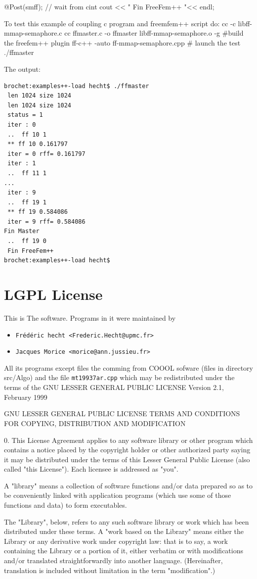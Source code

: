\documentclass[a4paper,twoside,12pt]{book}
\begin{document}
@Post(smff); // wait from cint
cout << " Fin FreeFem++ "<< endl;

\eFF	
To test this example of coupling c program and freemfem++ script do:
\bFF 
 cc -c libff-mmap-semaphore.c
 cc ffmaster.c -o ffmaster  libff-mmap-semaphore.o -g
 #build the freefem++ plugin
  ff-c++ -auto ff-mmap-semaphore.cpp
 # launch the test
 ./ffmaster
\eFF
 
 The output:
{\scriptsize
\begin{verbatim}
brochet:examples++-load hecht$ ./ffmaster 
 len 1024 size 1024 
 len 1024 size 1024 
 status = 1
 iter : 0 
 ..  ff 10 1
 ** ff 10 0.161797
 iter = 0 rff= 0.161797
 iter : 1 
 ..  ff 11 1
...
 iter : 9 
 ..  ff 19 1
 ** ff 19 0.584086
 iter = 9 rff= 0.584086
Fin Master 
 ..  ff 19 0
 Fin FreeFem++ 
brochet:examples++-load hecht$ 
\end{verbatim}
}
\section*{\freefempp LGPL License}
This is The \freefempp software.
Programs in it were maintained by
\begin{itemize}
\item \texttt{Fr\'{e}d\'{e}ric hecht <Frederic.Hecht@upmc.fr>}
\item \texttt{Jacques Morice <morice@ann.jussieu.fr>}
\end{itemize}

All its programs except files the comming from
  COOOL sofware (files in directory src/Algo)
 and the file \texttt{mt19937ar.cpp}
which may be redistributed under the terms of the
 GNU LESSER GENERAL PUBLIC LICENSE Version 2.1, February 1999


		  GNU LESSER GENERAL PUBLIC LICENSE
   TERMS AND CONDITIONS FOR COPYING, DISTRIBUTION AND MODIFICATION

  0. This License Agreement applies to any software library or other
program which contains a notice placed by the copyright holder or
other authorized party saying it may be distributed under the terms of
this Lesser General Public License (also called "this License").
Each licensee is addressed as "you".

  A "library" means a collection of software functions and/or data
prepared so as to be conveniently linked with application programs
(which use some of those functions and data) to form executables.

  The "Library", below, refers to any such software library or work
which has been distributed under these terms.  A "work based on the
Library" means either the Library or any derivative work under
copyright law: that is to say, a work containing the Library or a
portion of it, either verbatim or with modifications and/or translated
straightforwardly into another language.  (Hereinafter, translation is
included without limitation in the term "modification".)
\end{document}
